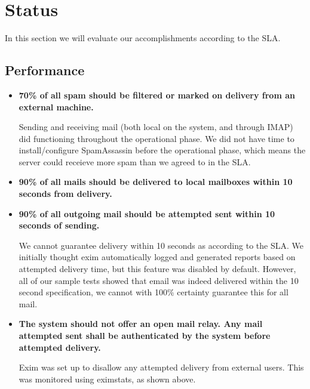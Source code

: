 \section{Status}
In this section we will evaluate our accomplishments according to the SLA. 

\subsection{Performance}
\begin{itemize}
\item \textbf{70\% of all spam should be filtered or marked on delivery from an
external machine.}

Sending and receiving mail (both local on the system, and through IMAP)
did functioning throughout the operational phase.
We did not have time to install/configure SpamAssassin before the
operational phase, which means the server could receieve more spam than
we agreed to in the SLA.

\item \textbf{90\% of all mails should be delivered to local mailboxes within 10
seconds from delivery.}
\item \textbf{90\% of all outgoing mail should be attempted sent within 10
seconds of sending.}

We cannot guarantee delivery within 10 seconds as according to the SLA. We
initially thought exim automatically logged and generated reports based on
attempted delivery time, but this feature was disabled by default. However, all of our sample tests
showed that email was indeed delivered within the 10 second specification, we
cannot with 100\% certainty guarantee this for all mail. 

\item \textbf{The system should not offer an open mail relay. Any mail attempted
sent shall be authenticated by the system before attempted delivery.}

Exim was set up to disallow any attempted delivery from external users. This was
monitored using eximstats, as shown above. 

\end{itemize}


